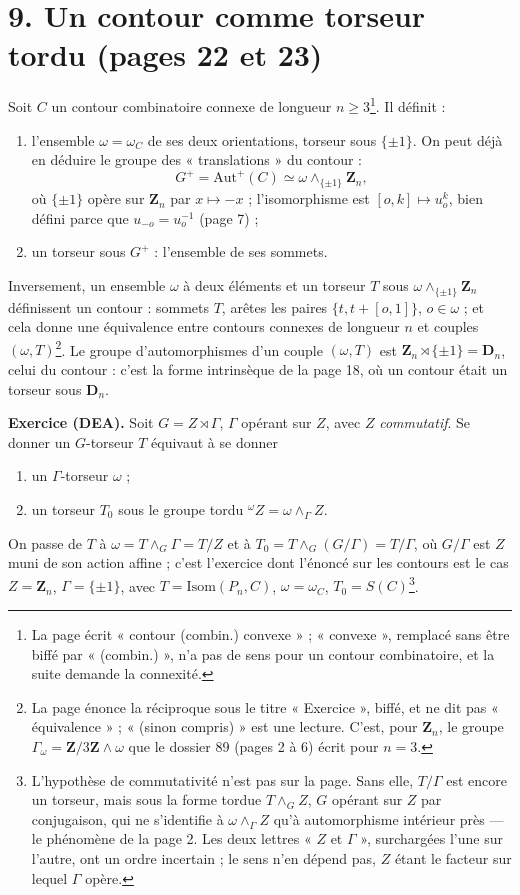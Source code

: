 \documentclass[11pt,a4paper]{article}
\begin{document}
\section*{9. Un contour comme torseur tordu (pages 22 et 23)}

Soit $C$ un contour combinatoire connexe de longueur $n \geq 3$\footnote{La
page écrit « contour (combin.) convexe » ; « convexe », remplacé sans être
biffé par « (combin.) », n'a pas de sens pour un contour combinatoire, et la
suite demande la connexité.}. Il définit :
\begin{enumerate}
\item[1.] l'ensemble $\omega = \omega_C$ de ses deux orientations, torseur
sous $\{\pm 1\}$. On peut déjà en déduire le groupe des « translations » du
contour :
\[
  G^{+} = \mathrm{Aut}^{+}(C) \simeq \omega \wedge_{\{\pm 1\}} \mathbf{Z}_n,
\]
où $\{\pm 1\}$ opère sur $\mathbf{Z}_n$ par $x \mapsto -x$ ; l'isomorphisme
est $[o, k] \mapsto u_o^{k}$, bien défini parce que $u_{-o} = u_o^{-1}$
(page 7) ;
\item[2.] un torseur sous $G^{+}$ : l'ensemble de ses sommets.
\end{enumerate}
Inversement, un ensemble $\omega$ à deux éléments et un torseur $T$ sous
$\omega \wedge_{\{\pm 1\}} \mathbf{Z}_n$ définissent un contour : sommets $T$,
arêtes les paires $\{t, t + [o, 1]\}$, $o \in \omega$ ; et cela donne une
équivalence entre contours connexes de longueur $n$ et couples
$(\omega, T)$\footnote{La page énonce la réciproque sous le titre
« Exercice », biffé, et ne dit pas « équivalence » ; « (sinon compris) » est
une lecture. C'est, pour $\mathbf{Z}_n$, le groupe $\Gamma_\omega =
\mathbf{Z}/3\mathbf{Z} \wedge \omega$ que le dossier 89 (pages 2 à 6) écrit
pour $n = 3$.}. Le groupe d'automorphismes d'un couple $(\omega, T)$ est
$\mathbf{Z}_n \rtimes \{\pm 1\} = \mathbf{D}_n$, celui du contour : c'est la
forme intrinsèque de la page 18, où un contour était un torseur sous
$\mathbf{D}_n$.

\textbf{Exercice (DEA).} Soit $G = Z \rtimes \Gamma$, $\Gamma$ opérant sur
$Z$, avec $Z$ \emph{commutatif}. Se donner un $G$-torseur $T$ équivaut à se
donner
\begin{enumerate}
\item[a)] un $\Gamma$-torseur $\omega$ ;
\item[b)] un torseur $T_0$ sous le groupe tordu ${}^{\omega}Z = \omega
\wedge_\Gamma Z$.
\end{enumerate}
On passe de $T$ à $\omega = T \wedge_G \Gamma = T/Z$ et à $T_0 = T \wedge_G
(G/\Gamma) = T/\Gamma$, où $G/\Gamma$ est $Z$ muni de son action affine ;
c'est l'exercice dont l'énoncé sur les contours est le cas $Z = \mathbf{Z}_n$,
$\Gamma = \{\pm 1\}$, avec $T = \mathrm{Isom}(P_n, C)$, $\omega = \omega_C$,
$T_0 = S(C)$\footnote{L'hypothèse de commutativité n'est pas sur la page.
Sans elle, $T/\Gamma$ est encore un torseur, mais sous la forme tordue $T
\wedge_G Z$, $G$ opérant sur $Z$ par conjugaison, qui ne s'identifie à
$\omega \wedge_\Gamma Z$ qu'à automorphisme intérieur près --- le phénomène
de la page 2. Les deux lettres « $Z$ et $\Gamma$ », surchargées l'une sur
l'autre, ont un ordre incertain ; le sens n'en dépend pas, $Z$ étant le
facteur sur lequel $\Gamma$ opère.}.
\end{document}
